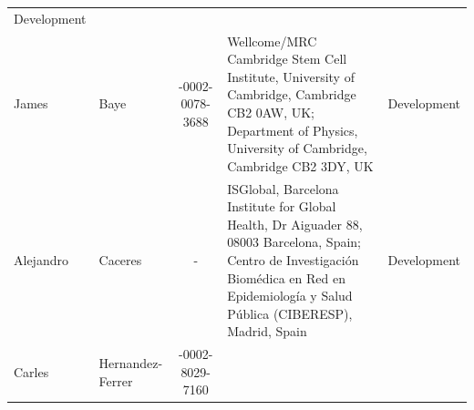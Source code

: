 \documentclass[
]{article}
\begin{document}
\begin{longtable}[]{@{}llcll@{}}
\begin{minipage}[t]{0.13\columnwidth}
Development\strut
\end{minipage}\tabularnewline
\begin{minipage}[t]{0.13\columnwidth}\raggedright
James\strut
\end{minipage} & \begin{minipage}[t]{0.19\columnwidth}\raggedright
Baye\strut
\end{minipage} & \begin{minipage}[t]{0.15\columnwidth}\centering
0000-0002-0078-3688\strut
\end{minipage} & \begin{minipage}[t]{0.27\columnwidth}\raggedright
Wellcome/MRC Cambridge Stem Cell Institute, University of Cambridge,
Cambridge CB2 0AW, UK; Department of Physics, University of Cambridge,
Cambridge CB2 3DY, UK\strut
\end{minipage} & \begin{minipage}[t]{0.13\columnwidth}\raggedright
Development\strut
\end{minipage}\tabularnewline
\begin{minipage}[t]{0.13\columnwidth}\raggedright
Alejandro\strut
\end{minipage} & \begin{minipage}[t]{0.19\columnwidth}\raggedright
Caceres\strut
\end{minipage} & \begin{minipage}[t]{0.15\columnwidth}\centering
-\strut
\end{minipage} & \begin{minipage}[t]{0.27\columnwidth}\raggedright
ISGlobal, Barcelona Institute for Global Health, Dr Aiguader 88, 08003
Barcelona, Spain; Centro de Investigación Biomédica en Red en
Epidemiología y Salud Pública (CIBERESP), Madrid, Spain\strut
\end{minipage} & \begin{minipage}[t]{0.13\columnwidth}\raggedright
Development\strut
\end{minipage}\tabularnewline
\begin{minipage}[t]{0.13\columnwidth}\raggedright
Carles\strut
\end{minipage} & \begin{minipage}[t]{0.19\columnwidth}\raggedright
Hernandez-Ferrer\strut
\end{minipage} & \begin{minipage}[t]{0.15\columnwidth}\centering
0000-0002-8029-7160\strut
\end{minipage} & \begin{minipage}[t]{0.27\columnwidth}\raggedright

\end{minipage}
\end{longtable}
\end{document}
